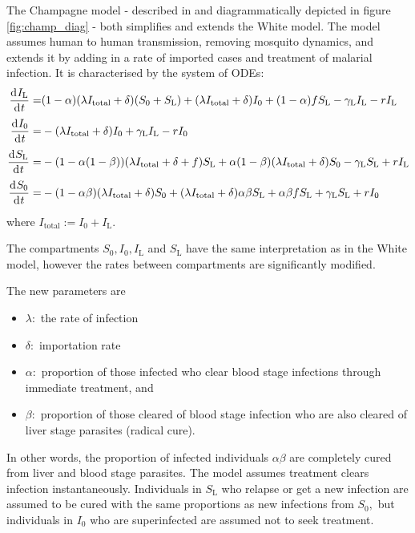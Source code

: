 The Champagne model - described in \parencite{champagne_using_2022} and
diagrammatically depicted in figure \ref{fig:champ_diag} -
both simplifies and extends the White model. The model assumes human to
human transmission, removing mosquito dynamics, and extends it by adding
in a rate of imported cases and treatment of malarial infection.
It is characterised by the system of ODEs:
\begin{align*}
    \frac{\diff I_\mathrm{L}}{\diff t} = & (1 - \alpha)(\lambda I_\mathrm{total} + \delta)(S_0 + S_\mathrm{L}) + (\lambda I_\mathrm{total} + \delta)I_0 + (1 - \alpha)fS_\mathrm{L} - \gamma_\mathrm{L}I_\mathrm{L} - rI_\mathrm{L}  \\
    \frac{\diff I_0}{\diff t} =          & -(\lambda I_\mathrm{total} + \delta)I_0 + \gamma_\mathrm{L}I_\mathrm{L} - rI_0                                                                                                            \\
    \frac{\diff S_\mathrm{L}}{\diff t} = & -(1 - \alpha(1 - \beta))(\lambda I_\mathrm{total} + \delta + f)S_\mathrm{L} + \alpha(1-\beta)(\lambda I_\mathrm{total} + \delta)S_0 - \gamma_\mathrm{L}S_\mathrm{L} + rI_\mathrm{L}       \\
    \frac{\diff S_0}{\diff t} =          & -(1 - \alpha\beta)(\lambda I_\mathrm{total} + \delta)S_0 + (\lambda I_\mathrm{total} + \delta)\alpha\beta S_\mathrm{L} + \alpha\beta fS_\mathrm{L} + \gamma_\mathrm{L}S_\mathrm{L} + rI_0
\end{align*} where $I_\mathrm{total} := I_0 + I_\mathrm{L}.$

The compartments $S_0, I_0, I_\mathrm{L}$ and $S_\mathrm{L}$ 
have the same interpretation as in the White model,
however the rates between compartments are significantly modified.

The new parameters are
\begin{itemize}
    \item $\lambda:$ the rate of infection
    \item $\delta:$ importation rate
    \item $\alpha:$ proportion of those infected who clear blood stage
          infections through immediate treatment, and
    \item $\beta:$ proportion of those cleared of blood stage infection who
          are also cleared of liver stage parasites (radical cure).
\end{itemize}
In other words, the proportion of infected individuals $\alpha\beta$ are
completely cured from liver and blood stage parasites. The model assumes
treatment clears infection instantaneously. Individuals in $S_\mathrm{L}$ who
relapse or get a new infection are assumed to be cured with the same
proportions as new infections from $S_0,$ but individuals in $I_0$ who are
superinfected are assumed not to seek treatment.

